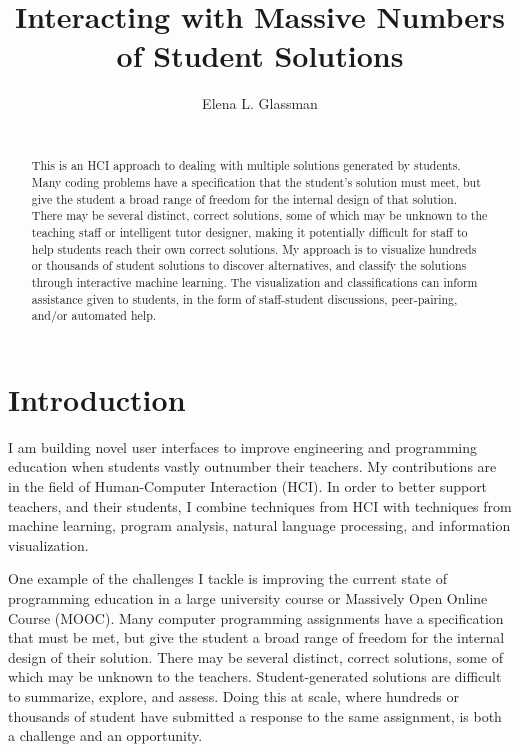 \documentclass{sigchi}
\begin{document}
\title{Interacting with Massive Numbers of Student Solutions}

\author{
  \alignauthor Elena L. Glassman\\
    \\
}

\maketitle

\begin{abstract}
This is an HCI approach to dealing with multiple solutions generated by students. Many coding problems have a specification that the student's solution must meet, but give the student a broad range of freedom for the internal design of that solution. There may be several distinct, correct solutions, some of which may be unknown to the teaching staff or intelligent tutor designer, making it potentially difficult for staff to help students reach their own correct solutions. My approach is to visualize hundreds or thousands of student solutions to discover alternatives, and classify the solutions through interactive machine learning. The visualization and classifications can inform assistance given to students, in the form of staff-student discussions, peer-pairing, and/or automated help.
\end{abstract}



\section{Introduction}

I am building novel user interfaces to improve engineering and programming education when students vastly outnumber their teachers. My contributions are in the field of Human-Computer Interaction (HCI). In order to better support teachers, and their students, I combine techniques from HCI with techniques from machine learning, program analysis, natural language processing, and information visualization.

One example of the challenges I tackle is improving the current state of programming education in a large university course or Massively Open Online Course (MOOC). Many computer programming assignments have a specification that must be met, but give the student a broad range of freedom for the internal design of their solution. There may be several distinct, correct solutions, some of which may be unknown to the teachers. Student-generated solutions are difficult to summarize, explore, and assess. Doing this at scale, where hundreds or thousands of student have submitted a response to the same assignment, is both a challenge and an opportunity. 
\end{document}
